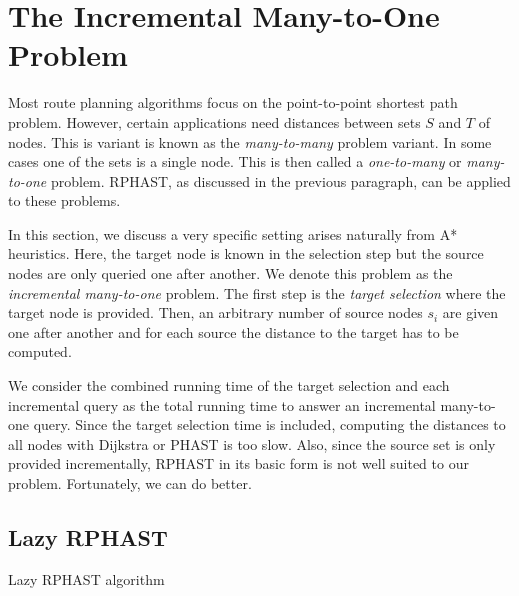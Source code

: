 \documentclass[manuscript,review]{acmart}
\begin{document}
\section{The Incremental Many-to-One Problem}\label{sec:lazy-rphast}

Most route planning algorithms focus on the point-to-point shortest path problem.
However, certain applications need distances between sets $S$ and $T$ of nodes.
This is variant is known as the \emph{many-to-many} problem variant.
In some cases one of the sets is a single node.
This is then called a \emph{one-to-many} or \emph{many-to-one} problem.
RPHAST, as discussed in the previous paragraph, can be applied to these problems.

In this section, we discuss a very specific setting arises naturally from A* heuristics.
Here, the target node is known in the selection step but the source nodes are only queried one after another.
We denote this problem as the \emph{incremental many-to-one} problem.
The first step is the \emph{target selection} where the target node is provided.
Then, an arbitrary number of source nodes $s_i$ are given one after another and for each source the distance to the target has to be computed.

We consider the combined running time of the target selection and each incremental query as the total running time to answer an incremental many-to-one query.
Since the target selection time is included, computing the distances to all nodes with Dijkstra or PHAST is too slow.
Also, since the source set is only provided incrementally, RPHAST in its basic form is not well suited to our problem.
Fortunately, we can do better.

\subsection{Lazy RPHAST}

\begin{algorithm2e}
\caption{Lazy RPHAST algorithm}
\label{algo:pot}
\end{algorithm2e}
\end{document}
